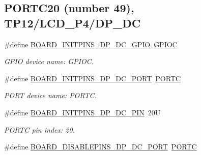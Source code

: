 \subsection*{P\+O\+R\+T\+C20 (number 49), T\+P12/\+L\+C\+D\+\_\+\+P4/\+D\+P\+\_\+\+DC}
\begin{DoxyCompactItemize}
\item 
\mbox{\label{group__pin__mux_ga1abd22c37841d6cec6cd8499a3a35694}} 
\#define \mbox{\hyperlink{group__pin__mux_ga1abd22c37841d6cec6cd8499a3a35694}{B\+O\+A\+R\+D\+\_\+\+I\+N\+I\+T\+P\+I\+N\+S\+\_\+\+D\+P\+\_\+\+D\+C\+\_\+\+G\+P\+IO}}~\mbox{\hyperlink{group___g_p_i_o___peripheral___access___layer_ga2dca03332d620196ba943bc2346eaa08}{G\+P\+I\+OC}}
\begin{DoxyCompactList}\small\item\em G\+P\+IO device name\+: G\+P\+I\+OC. \end{DoxyCompactList}\item 
\mbox{\label{group__pin__mux_ga80575dcacadb785c99c6c18f5c037568}} 
\#define \mbox{\hyperlink{group__pin__mux_ga80575dcacadb785c99c6c18f5c037568}{B\+O\+A\+R\+D\+\_\+\+I\+N\+I\+T\+P\+I\+N\+S\+\_\+\+D\+P\+\_\+\+D\+C\+\_\+\+P\+O\+RT}}~\mbox{\hyperlink{group___p_o_r_t___peripheral___access___layer_ga68fea88642279a70246e026e7221b0a5}{P\+O\+R\+TC}}
\begin{DoxyCompactList}\small\item\em P\+O\+RT device name\+: P\+O\+R\+TC. \end{DoxyCompactList}\item 
\mbox{\label{group__pin__mux_ga6434c731971874ebd34311174700e909}} 
\#define \mbox{\hyperlink{group__pin__mux_ga6434c731971874ebd34311174700e909}{B\+O\+A\+R\+D\+\_\+\+I\+N\+I\+T\+P\+I\+N\+S\+\_\+\+D\+P\+\_\+\+D\+C\+\_\+\+P\+IN}}~20U
\begin{DoxyCompactList}\small\item\em P\+O\+R\+TC pin index\+: 20. \end{DoxyCompactList}\item 
\mbox{\label{group__pin__mux_gacb41586b56fc60fc1a8ee0778bd029fc}} 
\#define \mbox{\hyperlink{group__pin__mux_gacb41586b56fc60fc1a8ee0778bd029fc}{B\+O\+A\+R\+D\+\_\+\+D\+I\+S\+A\+B\+L\+E\+P\+I\+N\+S\+\_\+\+D\+P\+\_\+\+D\+C\+\_\+\+P\+O\+RT}}~\mbox{\hyperlink{group___p_o_r_t___peripheral___access___layer_ga68fea88642279a70246e026e7221b0a5}{P\+O\+R\+TC}}

\end{DoxyCompactItemize}
